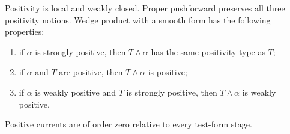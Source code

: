 \begin{proposition}
\label{prop:current-positivity-calculus}
Positivity is local and weakly closed.  Proper pushforward preserves all
three positivity notions.  Wedge product with a smooth form has the following
properties:
\begin{enumerate}
\item if $\alpha$ is strongly positive, then $T\wedge\alpha$ has the same
      positivity type as $T$;
\item if $\alpha$ and $T$ are positive, then $T\wedge\alpha$ is positive;
\item if $\alpha$ is weakly positive and $T$ is strongly positive, then
      $T\wedge\alpha$ is weakly positive.
\end{enumerate}
Positive currents are of order zero relative to every test-form stage.
\end{proposition}
